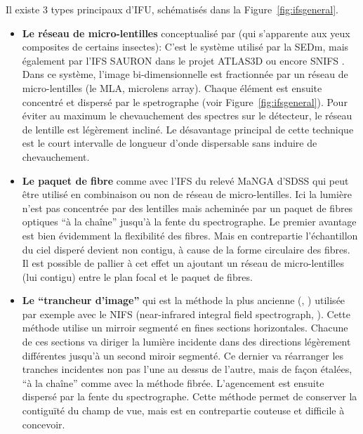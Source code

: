 \documentclass[../main/main.tex]{subfiles}
\begin{document}
Il existe 3 types principaux d'IFU, schématisés dans la Figure~\ref{fig:ifsgeneral}.
\begin{itemize}[label=$\bullet$]
\itemsep0em 
\item \textbf{Le réseau de micro-lentilles} conceptualisé par
  \citet{BaconIFUlens} (qui s'apparente aux yeux composites
  de certains insectes): C'est le système utilisé par la SEDm, mais
  également par l'IFS SAURON \citep{SAURONifs} dans le projet ATLAS3D
  \citep{ATLAS3D} ou encore SNIFS \citep{SNIFS2004}. Dans ce système,
  l'image bi-dimensionnelle est fractionnée par un réseau de
  micro-lentilles (le MLA, microlens array). Chaque élément est ensuite
  concentré et dispersé par le spetrographe (voir
  Figure~\ref{fig:ifsgeneral}). Pour éviter au maximum le chevauchement des
  spectres sur le détecteur, le réseau de lentille est légèrement
  incliné. Le désavantage principal de cette technique est le court
  intervalle de longueur d'onde dispersable sans induire de chevauchement.
  
\item \textbf{Le paquet de fibre} comme
  avec l'IFS du relevé MaNGA d'SDSS \citep{SDSSIFS} qui peut
  être utilisé en combinaison \citep{BardenIFUfiber} ou non
  \citep{allingtonIFUlensfiber} de réseau de micro-lentilles.
  Ici la lumière n'est pas concentrée par des lentilles mais acheminée
  par un paquet de fibres optiques ``à la chaîne'' jusqu'à la fente du spectrographe. Le
  premier avantage est bien évidemment la flexibilité des fibres. Mais
  en contrepartie l'échantillon du ciel disperé devient non contigu, à
  cause de la forme circulaire des fibres. Il est possible de pallier à
  cet effet un ajoutant un réseau de micro-lentilles (lui contigu) entre
  le plan focal et le paquet de fibres.  
  
\item \textbf{Le ``trancheur d'image''} qui est la méthode la plus
  ancienne (\citet{BowenIFUslicer}, \citet{ContentIFUslicer}) utilisée
  par exemple avec le NIFS
  (near-infrared integral field spectrograph, \citet{GeminiNIFS}). Cette
  méthode utilise un mirroir segmenté en fines sections
  horizontales. Chacune de ces sections va diriger la lumière incidente
  dans des directions légèrement différentes jusqu'à un second miroir
  segmenté. Ce dernier va réarranger les tranches incidentes non pas
  l'une au dessus de l'autre, mais de façon étalées, ``à la chaîne''
  comme avec la méthode fibrée. L'agencement est ensuite dispersé par la
  fente du spectrographe. Cette méthode permet de conserver la
  contiguïté du champ de vue, mais est en contrepartie couteuse et
  difficile à concevoir.
\end{itemize}
\end{document}

